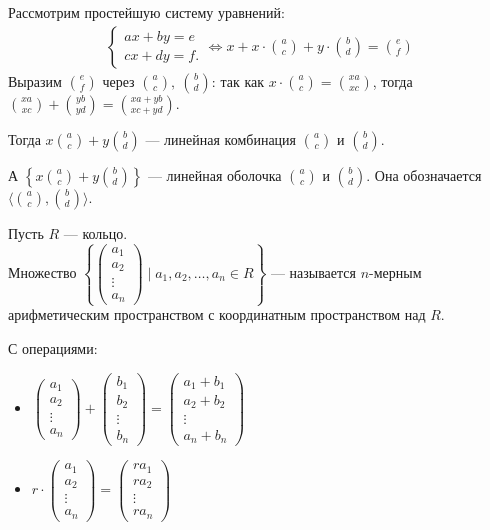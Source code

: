Рассмотрим простейшую систему уравнений: 
\begin{align*}
    \begin{cases}
        ax + by = e \\
        cx + dy = f.
    \end{cases} \iff x + x \cdot\binom{a}{c} + y \cdot \binom{b}{d} = \binom{e}{f}
\end{align*}
Выразим $\binom{e}{f}$ через $\binom{a}{c},\ \binom{b}{d}$: так как  $x \cdot \binom{a}{c} = \binom{xa}{xc}$, тогда  $\binom{xa}{xc} + \binom{yb}{yd} = \binom{xa + yb}{xc + yd}$.

\begin{definition}
Тогда $x\binom{a}{c} + y\binom{b}{d}$ --- линейная комбинация  $\binom{a}{c}$ и  $\binom{b}{d}$.
\end{definition}
\begin{definition}
    А $\left\{x \binom{a}{c} + y \binom{b}{d}\right\}$ --- линейная оболочка  $\binom{a}{c}$ и  $\binom{b}{d}$. Она обозначается  $\langle \binom{a}{c}, \binom{b}{d} \rangle$.
\end{definition}
\begin{definition}
    Пусть $R$ --- кольцо. \\
    Множество $\left\{ \begin{pmatrix} a_1 \\ a_2 \\ \vdots \\ a_n \end{pmatrix} \mid a_1, a_2, \ldots, a_n \in R\right\}$ --- называется $n$-мерным арифметическим пространством с координатным пространством над $R$.

    С операциями:
    \begin{itemize}
        \item $\begin{pmatrix} a_1 \\ a_2 \\ \vdots \\ a_n \end{pmatrix} + \begin{pmatrix} b_1 \\ b_2 \\ \vdots \\ b_n \end{pmatrix} = \begin{pmatrix} a_1 + b_1\\ a_2 + b_2 \\ \vdots \\ a_n + b_n \end{pmatrix}$ 
        \item $r \cdot \begin{pmatrix} a_1 \\ a_2 \\ \vdots \\ a_n \end{pmatrix} = \begin{pmatrix} ra_1 \\ ra_2 \\ \vdots \\ ra_n \end{pmatrix}$  
    \end{itemize}
\end{definition}
